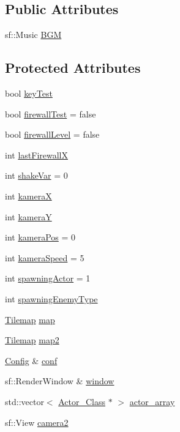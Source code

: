 \subsection*{Public Attributes}
\begin{DoxyCompactItemize}
\item 
sf\+::\+Music \hyperlink{class_game___state_a3e529295cb321b91f68594e06ee5f8de}{B\+GM}
\end{DoxyCompactItemize}
\subsection*{Protected Attributes}
\begin{DoxyCompactItemize}
\item 
bool \hyperlink{class_game___state_a173b2606fcaf010b8f1eb8b6e5487a4e}{key\+Test}
\item 
bool \hyperlink{class_game___state_a6da4c593a72687a91c91027463fb9083}{firewall\+Test} = false
\item 
bool \hyperlink{class_game___state_a0e432196bf012dbfa928c947d829ae69}{firewall\+Level} = false
\item 
int \hyperlink{class_game___state_ab7f247337f6c29608333e2c8fe79b973}{last\+FirewallX}
\item 
int \hyperlink{class_game___state_a6aef3b71ebbfc46aabe99005ad609c96}{shake\+Var} = 0
\item 
int \hyperlink{class_game___state_a24adb6b7cfae8390f484501af0835b3f}{kameraX}
\item 
int \hyperlink{class_game___state_ad4fc3a4ab3d6caf08cfc8ae92505ebd6}{kameraY}
\item 
int \hyperlink{class_game___state_a800d81a46d0b4dead0b3516ab24ebc9c}{kamera\+Pos} = 0
\item 
int \hyperlink{class_game___state_abbd68113ae4a7ed42d4e600edd857ef1}{kamera\+Speed} = 5
\item 
int \hyperlink{class_game___state_aea29b5ae20f29dea3ba382e0f406319e}{spawning\+Actor} = 1
\item 
int \hyperlink{class_game___state_ab3f5efd3966eb17cff370700a750e1de}{spawning\+Enemy\+Type}
\item 
\hyperlink{class_tilemap}{Tilemap} \hyperlink{class_game___state_af09e995b6bf08cbc23ef6dc4b32ad5cd}{map}
\item 
\hyperlink{class_tilemap}{Tilemap} \hyperlink{class_game___state_a9de848045ff6eb1a2a2548a82fcd87b5}{map2}
\item 
\hyperlink{class_config}{Config} \& \hyperlink{class_game___state_a6f82c6c66962953aee7de556d3877eeb}{conf}
\item 
sf\+::\+Render\+Window \& \hyperlink{class_game___state_a5a9bb4b732ee25b0f9de3baa2ee71045}{window}
\item 
std\+::vector$<$ \hyperlink{class_actor___class}{Actor\+\_\+\+Class} $\ast$ $>$ \hyperlink{class_game___state_a5b5ad0c10282bbb7e407ccbba8a7c213}{actor\+\_\+array}
\item 
sf\+::\+View \hyperlink{class_game___state_a041c421a58505094d2dfc07f8a055e45}{camera2}
\end{DoxyCompactItemize}


